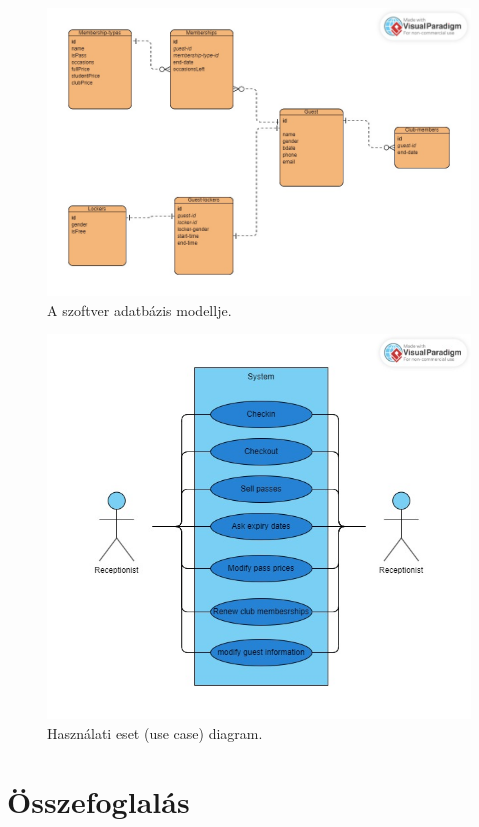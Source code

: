 \documentclass[12pt]{article}
\begin{document}
\begin{figure}
\includegraphics[width=\textwidth]{database}
\caption{A szoftver adatbázis modellje.}
\end{figure}

\begin{figure}
\includegraphics[width=\textwidth]{usecase}
\caption{Használati eset (use case) diagram. }
\end{figure}

\newpage
\section*{Összefoglalás}
\end{document}
